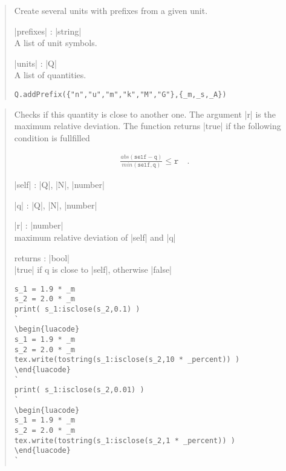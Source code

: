 \documentclass{ltxdoc}
\begin{document}
\begin{quote}
  Create several units with prefixes from a given unit.

  \begin{description}
  \item |prefixes| : |string|\\
    A list of unit symbols.

  \item |units| : |Q|\\
    A list of quantities.
  \end{description}


\begin{lstlisting}
Q.addPrefix({"n","u","m","k","M","G"},{_m,_s,_A})
\end{lstlisting}
\end{quote}



\begin{quote}
  Checks if this quantity is close to another one. The argument |r| is the maximum relative deviation. The function returns |true| if the following condition is fullfilled

  \begin{align*}
   \frac{abs(\texttt{self} - \texttt{q})}{min(\texttt{self},\texttt{q})} \leq \texttt{r} \quad.
  \end{align*}

  \begin{description}
  \item |self| : |Q|, |N|, |number|

  \item |q| : |Q|, |N|, |number|

  \item |r| : |number|\\
    maximum relative deviation of |self| and |q|

  \item returns : |bool|\\
    |true| if q is close to |self|, otherwise |false|
  \end{description}

\begin{lstlisting}
s_1 = 1.9 * _m
s_2 = 2.0 * _m
print( s_1:isclose(s_2,0.1) )
`
\begin{luacode}
s_1 = 1.9 * _m
s_2 = 2.0 * _m
tex.write(tostring(s_1:isclose(s_2,10 * _percent)) )
\end{luacode}
`
print( s_1:isclose(s_2,0.01) )
`
\begin{luacode}
s_1 = 1.9 * _m
s_2 = 2.0 * _m
tex.write(tostring(s_1:isclose(s_2,1 * _percent)) )
\end{luacode}
`
\end{lstlisting}

\end{quote}
\end{document}
